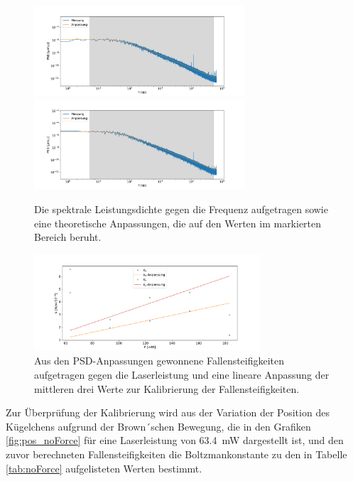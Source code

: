             \begin{figure}[h]
            \centering
            \includegraphics[width = 0.7\textwidth]{freq_x.pdf}
            \includegraphics[width = 0.7\textwidth]{freq_y.pdf}
            \caption{Die spektrale Leistungsdichte gegen die Frequenz aufgetragen sowie eine theoretische Anpassungen, die auf den Werten im markierten Bereich beruht.}
            \label{fig:freq_noForce}
            \end{figure}
            \FloatBarrier
            \begin{figure}[h]
            \centering
            \includegraphics[width = 0.75\textwidth]{k_noForce.pdf}
            \caption{Aus den PSD-Anpassungen gewonnene Fallensteifigkeiten aufgetragen gegen die Laserleistung und eine lineare Anpassung der mittleren drei Werte zur Kalibrierung der Fallensteifigkeiten.}
            \label{fig:k_noForce}
            \end{figure}
            \FloatBarrier
            Zur Überprüfung der Kalibrierung wird aus der Variation der Position des Kügelchens aufgrund der Brown´schen Bewegung, die in den Grafiken \ref{fig:pos_noForce} für eine Laserleistung von 
            \SI{63.4}{\milli\watt}
            dargestellt ist, und den zuvor berechneten Fallensteifigkeiten die Boltzmankonstante zu den in Tabelle \ref{tab:noForce} aufgelisteten Werten bestimmt.
